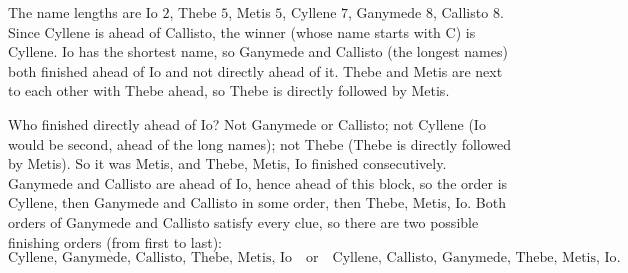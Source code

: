 The name lengths are Io $2$, Thebe $5$, Metis $5$, Cyllene $7$, Ganymede $8$, Callisto $8$. Since Cyllene is ahead of Callisto, the winner (whose name starts with C) is Cyllene. Io has the shortest name, so Ganymede and Callisto (the longest names) both finished ahead of Io and not directly ahead of it. Thebe and Metis are next to each other with Thebe ahead, so Thebe is directly followed by Metis.

Who finished directly ahead of Io? Not Ganymede or Callisto; not Cyllene (Io would be second, ahead of the long names); not Thebe (Thebe is directly followed by Metis). So it was Metis, and Thebe, Metis, Io finished consecutively. Ganymede and Callisto are ahead of Io, hence ahead of this block, so the order is Cyllene, then Ganymede and Callisto in some order, then Thebe, Metis, Io. Both orders of Ganymede and Callisto satisfy every clue, so there are two possible finishing orders (from first to last):
\[\boxed{\text{Cyllene, Ganymede, Callisto, Thebe, Metis, Io}}\quad\text{or}\quad\boxed{\text{Cyllene, Callisto, Ganymede, Thebe, Metis, Io}}.\]
